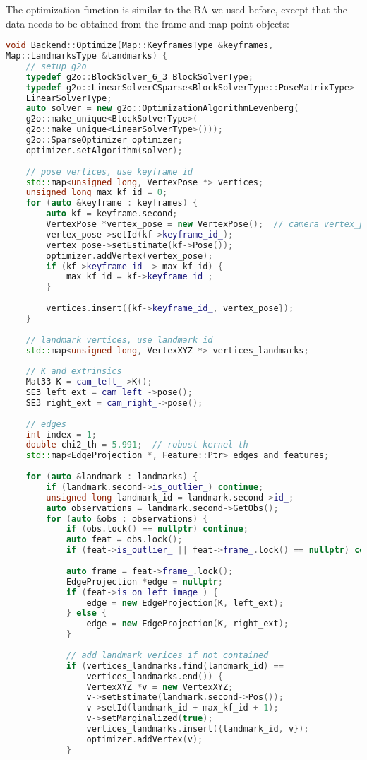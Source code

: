 The optimization function is similar to the BA we used before, except that the data needs to be obtained from the frame and map point objects:
\begin{lstlisting}[language=c++,caption=slambook2/ch13/src/backend.cpp]
void Backend::Optimize(Map::KeyframesType &keyframes,
Map::LandmarksType &landmarks) {
	// setup g2o
	typedef g2o::BlockSolver_6_3 BlockSolverType;
	typedef g2o::LinearSolverCSparse<BlockSolverType::PoseMatrixType>
	LinearSolverType;
	auto solver = new g2o::OptimizationAlgorithmLevenberg(
	g2o::make_unique<BlockSolverType>(
	g2o::make_unique<LinearSolverType>()));
	g2o::SparseOptimizer optimizer;
	optimizer.setAlgorithm(solver);
	
	// pose vertices, use keyframe id
	std::map<unsigned long, VertexPose *> vertices;
	unsigned long max_kf_id = 0;
	for (auto &keyframe : keyframes) {
		auto kf = keyframe.second;
		VertexPose *vertex_pose = new VertexPose();  // camera vertex_pose
		vertex_pose->setId(kf->keyframe_id_);
		vertex_pose->setEstimate(kf->Pose());
		optimizer.addVertex(vertex_pose);
		if (kf->keyframe_id_ > max_kf_id) {
			max_kf_id = kf->keyframe_id_;
		}
		
		vertices.insert({kf->keyframe_id_, vertex_pose});
	}
	
	// landmark vertices, use landmark id
	std::map<unsigned long, VertexXYZ *> vertices_landmarks;
	
	// K and extrinsics
	Mat33 K = cam_left_->K();
	SE3 left_ext = cam_left_->pose();
	SE3 right_ext = cam_right_->pose();
	
	// edges
	int index = 1;
	double chi2_th = 5.991;  // robust kernel th
	std::map<EdgeProjection *, Feature::Ptr> edges_and_features;
	
	for (auto &landmark : landmarks) {
		if (landmark.second->is_outlier_) continue;
		unsigned long landmark_id = landmark.second->id_;
		auto observations = landmark.second->GetObs();
		for (auto &obs : observations) {
			if (obs.lock() == nullptr) continue;
			auto feat = obs.lock();
			if (feat->is_outlier_ || feat->frame_.lock() == nullptr) continue;
			
			auto frame = feat->frame_.lock();
			EdgeProjection *edge = nullptr;
			if (feat->is_on_left_image_) {
				edge = new EdgeProjection(K, left_ext);
			} else {
				edge = new EdgeProjection(K, right_ext);
			}
			
			// add landmark verices if not contained
			if (vertices_landmarks.find(landmark_id) ==
				vertices_landmarks.end()) {
				VertexXYZ *v = new VertexXYZ;
				v->setEstimate(landmark.second->Pos());
				v->setId(landmark_id + max_kf_id + 1);
				v->setMarginalized(true);
				vertices_landmarks.insert({landmark_id, v});
				optimizer.addVertex(v);
			}
			

\end{lstlisting}
